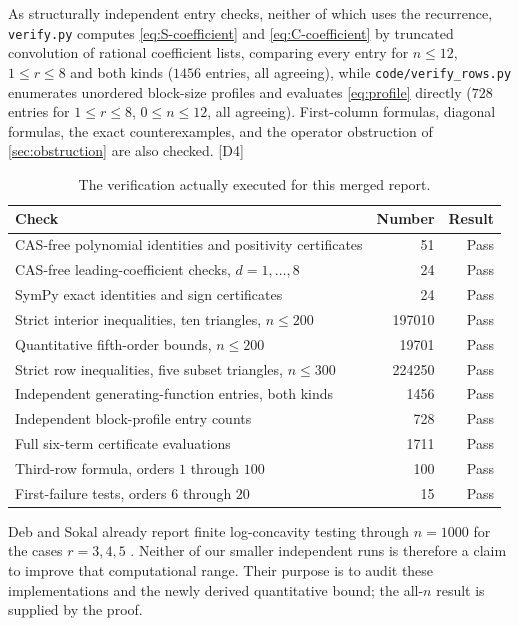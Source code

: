 \documentclass[11pt,a4paper]{article}
\numberwithin{equation}{section}
\theoremstyle{definition}
\theoremstyle{remark}
\newcommand{\dup}[1]{{\small\textsf{\color{MutedInk}[#1]}}}
\begin{document}
As structurally independent entry checks, neither of which uses the
recurrence, \texttt{verify.py} computes \eqref{eq:S-coefficient} and
\eqref{eq:C-coefficient} by truncated convolution of rational coefficient
lists, comparing every entry for $n\le12$, $1\le r\le8$ and both kinds
($1456$ entries, all agreeing), while \texttt{code/verify\_rows.py}
enumerates unordered block-size profiles and evaluates \eqref{eq:profile}
directly ($728$ entries for $1\le r\le8$, $0\le n\le12$, all agreeing).
First-column formulas, diagonal formulas, the exact counterexamples, and
the operator obstruction of \cref{sec:obstruction} are also checked. \dup{D4}

\begin{table}[htbp]
\centering
\small
\renewcommand{\arraystretch}{1.2}
\begin{tabular}{@{}p{}rr@{}}
\toprule
Check & Number & Result\\
\midrule
CAS-free polynomial identities and positivity certificates & 51 & Pass\\
CAS-free leading-coefficient checks, $d=1,\ldots,8$ & 24 & Pass\\
SymPy exact identities and sign certificates & 24 & Pass\\
Strict interior inequalities, ten triangles, $n\le200$ & 197010 & Pass\\
Quantitative fifth-order bounds, $n\le200$ & 19701 & Pass\\
Strict row inequalities, five subset triangles, $n\le300$ & 224250 & Pass\\
Independent generating-function entries, both kinds & 1456 & Pass\\
Independent block-profile entry counts & 728 & Pass\\
Full six-term certificate evaluations & 1711 & Pass\\
Third-row formula, orders $1$ through $100$ & 100 & Pass\\
First-failure tests, orders $6$ through $20$ & 15 & Pass\\
\bottomrule
\end{tabular}
\caption{The verification actually executed for this merged report.}
\label{tab:checks}
\end{table}

Deb and Sokal already report finite log-concavity testing through
$n=1000$ for the cases $r=3,4,5$ \cite[Appendix~C, Tables~1--2]{DebSokal}.
Neither of our smaller independent runs is therefore a claim to improve
that computational range. Their purpose is to audit these implementations
and the newly derived quantitative bound; the all-$n$ result is supplied by
the proof.
\end{document}
